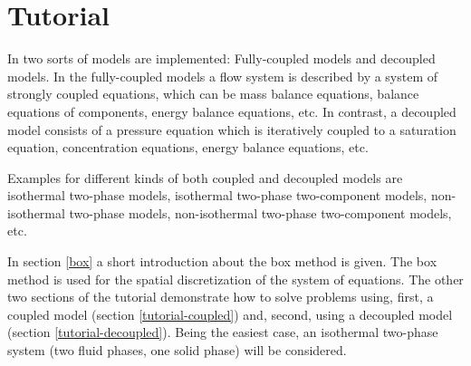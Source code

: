\chapter[Tutorial]{Tutorial}\label{chp:tutorial}

In \Dumux two sorts of models are implemented: Fully-coupled models and decoupled models. In the fully-coupled models a flow system is described by a system of strongly coupled equations, which can be mass balance equations, balance equations of components, energy balance equations, etc. In contrast, a decoupled model consists of a pressure equation which is iteratively coupled to a saturation equation, concentration equations, energy balance equations, etc.

Examples for different kinds of both coupled and decoupled models are isothermal two-phase models, isothermal two-phase two-component models, non-isothermal two-phase models, non-isothermal two-phase two-component models, etc.

In section \ref{box} a short introduction about the box method is given. The box method is used for the spatial discretization of the system of equations. The other two sections of the tutorial demonstrate how to solve problems using, first, a coupled model (section \ref{tutorial-coupled}) and, second, using a decoupled model (section \ref{tutorial-decoupled}). Being the easiest case, an isothermal two-phase system (two fluid phases, one solid phase) will be considered.


%

